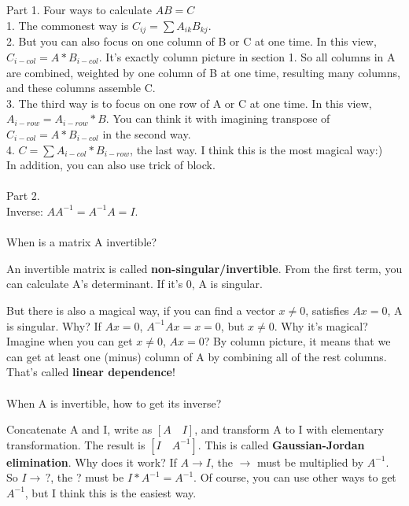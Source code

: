 \documentclass{article}
\begin{document}
\begin{spacing}{1.5}
\section{}
Part 1. Four ways to calculate $AB=C$ \\
1. The commonest way is $C_{ij} = \sum A_{ik}B_{kj}$. \\
2. But you can also focus on one column of B or C at one time. In this view, $C_{i-col} = A*B_{i-col}$. It's exactly column picture in section 1. So all columns in A are combined, weighted by one column of B at one time, resulting many columns, and these columns assemble C. \\
3. The third way is to focus on one row of A or C at one time. In this view, $A_{i-row} = A_{i-row} * B$. You can think it with imagining transpose of $C_{i-col} = A*B_{i-col}$ in the second way. \\
4. $C = \sum A_{i-col}*B_{i-row}$, the last way. I think this is the most magical way:) \\
In addition, you can also use trick of block.\\ 
\\ Part 2. \\
Inverse: $AA^{-1}=A^{-1}A=I$. \\
\\ When is a matrix A invertible?

An invertible matrix is called {\bfseries non-singular/invertible}. From the first term, you can calculate A's determinant. If it's 0, A is singular.

But there is also a magical way, if you can find a vector $x \neq 0$, satisfies $Ax=0$, A is singular. Why? If $Ax=0$, $A^{-1}Ax=x=0$, but $x \neq 0$. Why it's magical? Imagine when you can get $x \neq 0$, $Ax=0$? By column picture, it means that we can get at least one (minus) column of A by combining all of the rest columns. That's called {\bfseries linear dependence}! \\ 
\\ When A is invertible, how to get its inverse?

Concatenate A and I, write as $[A \quad I]$, and transform A to I with elementary transformation. The result is $[I \quad A^{-1}]$. This is called {\bfseries Gaussian-Jordan elimination}. Why does it work? If $A \rightarrow I$, the $\rightarrow$ must be multiplied by $A^{-1}$. So $I \rightarrow \, ?$, the ? must be $I*A^{-1}=A^{-1}$. Of course, you can use other ways to get $A^{-1}$, but I think this is the easiest way.



\end{spacing}
\end{document}
